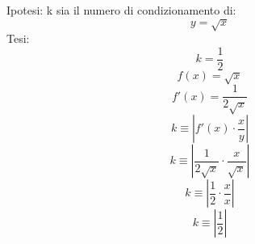 Ipotesi: k sia il numero di condizionamento di:
\begin{equation}
y = \sqrt{x} 
\end{equation}
Tesi:
\begin{equation}
k=\frac{1}{2}
\end{equation}
\begin{equation}
f(x) = \sqrt{x}
\end{equation}
\begin{equation}
f'(x) = \frac{1}{2\sqrt{x}}
\end{equation}
\begin{equation}
k \equiv |f'(x) \cdot \frac{x}{y} |
\end{equation}
\begin{equation}
k \equiv | \frac{1}{2\sqrt{x}} \cdot \frac{x}{ \sqrt{x} } |
\end{equation}
\begin{equation}
k \equiv | \frac{1}{2} \cdot \frac{x}{x} |
\end{equation}
\begin{equation}
k \equiv | \frac{1}{2}|
\end{equation}